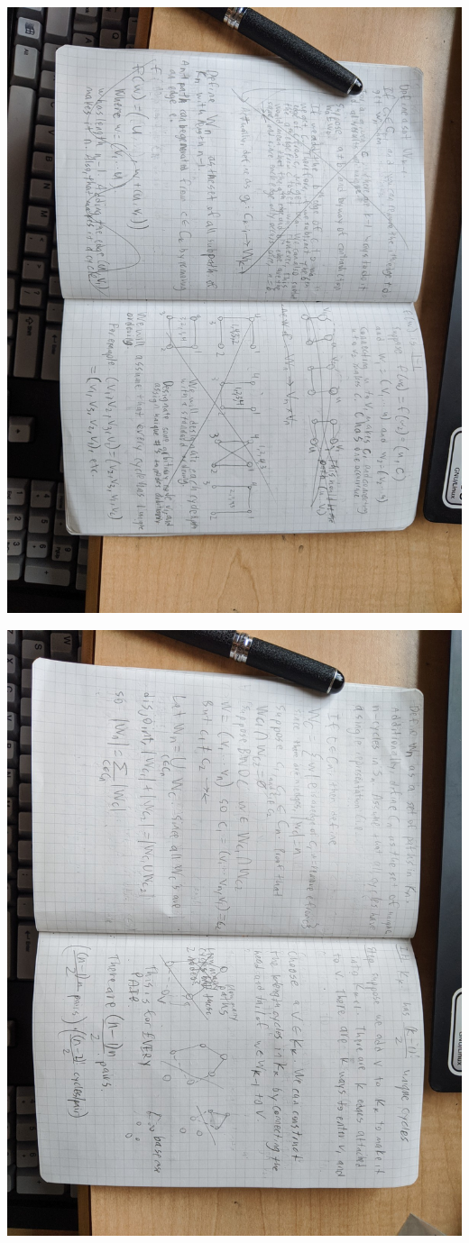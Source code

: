 \documentclass{article}
\begin{document}
\begin{landscape}
    \pagebreak
    
    \centering
    \thispagestyle{empty}
    \includegraphics[angle=90, width=0.9\linewidth]{mt/5.jpg}

    \pagebreak
    
    \centering
    \thispagestyle{empty}
    \includegraphics[angle=90, width=0.9\linewidth]{mt/6.jpg}


\end{landscape}
\end{document}

